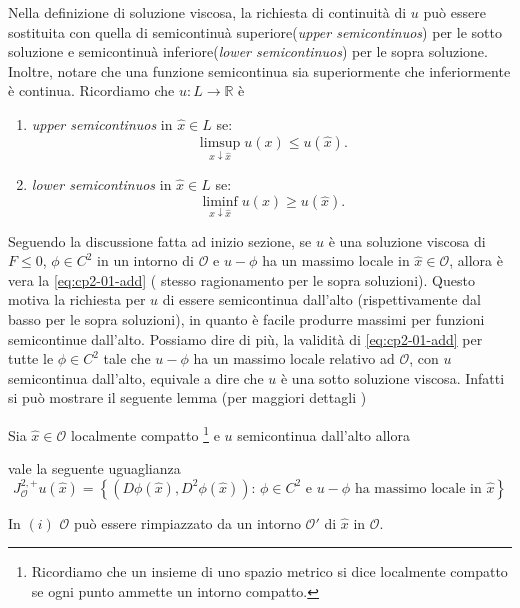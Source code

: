 \begin{osservazione}
\label{oss:cp2-01}
Nella definizione di soluzione viscosa, la richiesta di continuità di $u$ può essere sostituita con quella di semicontinuà superiore(\emph{upper semicontinuos}) per le sotto soluzione e semicontinuà inferiore(\emph{lower semicontinuos}) per le sopra soluzione. Inoltre, notare che una funzione semicontinua sia superiormente che inferiormente è continua. Ricordiamo che  $u:L \to\mathbb{R}$ è
\begin{enumerate}
  \item \emph{upper semicontinuos} in $\hat{x}\in L$ se:
    \[
      \limsup_{x\downarrow\hat{x}}u(x)\leq u(\hat{x}).
    \]
  \item \emph{lower semicontinuos} in $\hat{x}\in L$ se:
    \[
      \liminf_{x\downarrow\hat{x}}u(x)\geq u(\hat{x}).
    \]
\end{enumerate}  

Seguendo la discussione fatta ad inizio sezione, se $u$ è una soluzione viscosa di $F\leq 0$, $\phi\in C^2$ in un intorno di $\mathcal{O}$ e $u-\phi$ ha un massimo locale in $\hat{x}\in\mathcal{O}$, allora è vera la \eqref{eq:cp2-01-add} ( stesso ragionamento per le sopra soluzioni). Questo motiva la richiesta per $u$ di essere semicontinua dall'alto (rispettivamente dal basso per le sopra soluzioni), in quanto è facile produrre massimi per funzioni semicontinue dall'alto.
Possiamo dire di più, la validità di \eqref{eq:cp2-01-add} per tutte le $\phi\in C^2$ tale che $u-\phi$ ha un massimo locale relativo ad $\mathcal{O}$, con $u$ semicontinua dall'alto, equivale a dire che $u$ è una sotto soluzione viscosa.  Infatti si può mostrare il seguente lemma (per maggiori dettagli \cite[vedi][§3]{giga:main})
\begin{lemma}
  \label{lem:cp2-01}
 Sia $\hat{x}\in\mathcal{O}$ localmente compatto%
\footnote{ Ricordiamo che un insieme di uno spazio metrico si dice localmente compatto se ogni punto ammette un intorno compatto.}
 e $u$ semicontinua dall'alto allora
\begin{enumi}
  \item  vale la seguente uguaglianza
\[
J_{\mathcal{O}}^{2,+}u(\hat{x}) = \left\{(D\phi(\hat{x}),D^2\phi(\hat{x})):\,\phi\in C^2\text{ e $u-\phi$ ha massimo locale in $\hat{x}$}\right\}
\]
  \item  In $(i)$ $\mathcal{O}$ può essere rimpiazzato da un intorno $\mathcal{O}'$ di $\hat{x}$ in $\mathcal{O}$.
\end{enumi}
\end{lemma}


\end{osservazione}
